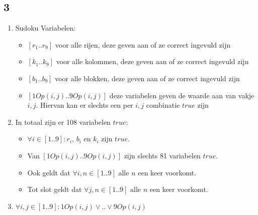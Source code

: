 \documentclass[]{article}
\begin{document}
  \subsection*{3}
  \begin{enumerate}[a]
    \item Sudoku Variabelen:
    \begin{itemize}
      \item $ [r_1 .. r_9] $ voor alle rijen, deze geven aan of ze correct ingevuld zijn
      \item $ [k_1 .. k_9] $ voor alle kolommen, deze geven aan of ze correct ingevuld zijn
      \item $ [b_1 .. b_9] $ voor alle blokken, deze geven aan of ze correct ingevuld zijn
      \item $ [1Op(i,j) .. 9Op(i,j)] $ deze variabelen geven de waarde aan van vakje $i,j$. Hiervan kan er slechts een per $i,j$ combinatie $true$ zijn
    \end{itemize}
    \item In totaal zijn er 108 variabelen $true$:
    \begin{itemize}
      \item $ \forall i \in [1..9] : r_i $, $b_i$ en $k_i$ zijn $true$.
      \item Van $ [1Op(i,j) .. 9Op(i,j)] $ zijn slechts 81 variabelen $true$.
      \item Ook geldt dat $\forall i,n \in [1..9]$ alle $n$ een keer voorkomt.
      \item Tot slot geldt dat $\forall j,n \in [1..9]$ alle $n$ een keer voorkomt.
    \end{itemize}
    \item $\forall i,j \in [1..9]: 1Op(i,j) \lor .. \lor 9Op(i,j) $
  \end{enumerate}
\end{document}

